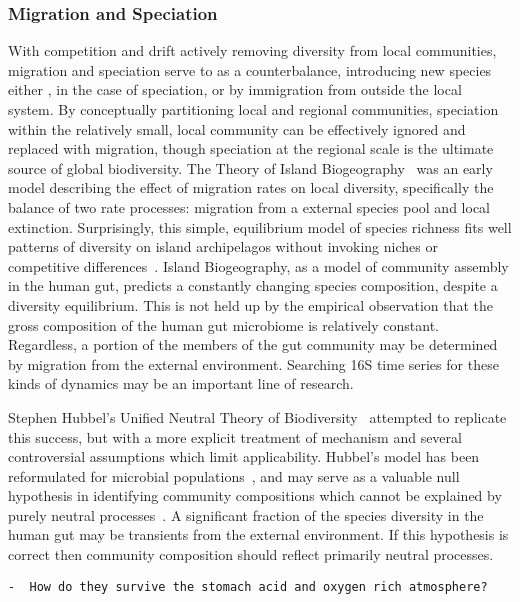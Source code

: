 \documentclass[12pt]{article}
\begin{document}
\subsubsection{Migration and Speciation}
With competition and drift actively removing diversity from local
communities, migration and speciation serve to as a counterbalance,
introducing new species either ,
in the case of speciation, or by immigration from outside the
local system.
By conceptually partitioning local and regional communities,
speciation within the relatively small, local community can be effectively
ignored and replaced with migration,
though speciation at the regional scale is the ultimate source of global
biodiversity.
The Theory of Island Biogeography~\citep{macarthur1967b} was
an early model describing the effect of migration rates on local diversity,
specifically the balance of two rate processes:
migration from a external species pool and local extinction.
Surprisingly, this simple, equilibrium model of species richness
fits well patterns of diversity on island archipelagos
without invoking niches or competitive differences~\citep{TODO}.
Island Biogeography, as a model of community assembly in the human gut,
predicts a constantly changing species composition,
despite a diversity equilibrium.
This is not held up by the empirical observation that the gross composition of
the human gut microbiome is relatively constant.
Regardless, a portion of the members of the gut community may be determined
by migration from the external environment.
Searching 16S time series for these kinds of dynamics may be an important
line of research.

Stephen Hubbel's Unified Neutral Theory of Biodiversity~\citeyearpar{TODO}
attempted to replicate this success,
but with a more explicit treatment of mechanism
and several controversial assumptions which limit applicability.
Hubbel's model has been
reformulated for microbial populations~\citep{Sloan2005},
and may serve as a valuable null hypothesis in identifying community
compositions which cannot be explained
by purely neutral processes~\cite{VenkataramenTODO}.
A significant fraction of the species diversity in the human gut may be
transients from the external environment.
If this hypothesis is correct then community composition should reflect
primarily neutral processes.

\begin{verbatim}
-  How do they survive the stomach acid and oxygen rich atmosphere?
\end{verbatim}
\end{document}
